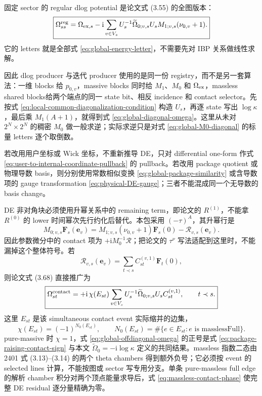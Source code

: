 \documentclass[11pt,a4paper]{ctexart}
\newcommand{\ii}{\mathrm i}
\newcommand{\cR}{\mathcal R}
\begin{document}
固定 sector 的 regular dlog potential 是论文式 (3.55) 的全图版本：
\begin{equation}
 \boxed{
 \Omega_{ss}^{\rm reg}
 =\Omega_{{\rm ex},s}
 -\ii\sum_{v\in V_s}
 U_s^{-1}\widetilde\Omega_{0;v,s}U_s
 M_{1;v,s}(\nu_{0,v}+1).
 }
 \label{eq:global-diagonal-omega}
\end{equation}
它的 letters 就是全部式 \eqref{eq:global-energy-letter}，不需要先对 IBP 关系做线性求解。

因此 dlog producer 与迭代 producer 使用的是同一份 registry，而不是另一套算法：一维 blocks 给 $p_{0,v}$，massive blocks 同时给 $M_1$、$M_0$ 和 $\Omega_{\rm ex}$，massless shared blocks给两个端点的同一 state bit、相反 incidence 和 contact selector。先按式 \eqref{eq:local-common-diagonalization-condition} 构造 $U_s$，再逐 state 写出 $\log\kappa$，最后乘 $M_1(A+1)$，就得到式 \eqref{eq:global-diagonal-omega}。这里从未对 $2^N\times2^N$ 的稠密 $M_0$ 做一般求逆；实际求逆只是对式 \eqref{eq:global-M0-diagonal} 的标量 letters 逐个取倒数。

若改用用户坐标或 Wick 坐标，不重新推导 DE，只对 differential one-form 作式 \eqref{eq:user-to-internal-coordinate-pullback} 的 pullback。若改用 package quotient 或物理导数 basis，则分别使用常数相似变换 \eqref{eq:global-package-similarity} 或含导数项的 gauge transformation \eqref{eq:physical-DE-gauge}；三者不能混成同一个无导数的 basis change。

DE 非对角块必须使用升幂关系中的 remaining term，即论文的 $R^{(1)}$，不能拿 $R^{(0)}$ 的 lower 时间幂次先行约化后替代。本包采用 $(-\tau)^A$，其升幂行是
\begin{equation}
 M_{0;v,s}\bm F_s(\bm e_v)
 =M_{1;v,s}(\nu_{0,v}+1)\bm F_s(0)-\cR_{v,s}(\bm e_v).
 \label{eq:package-raising-contact-sign}
\end{equation}
因此参数微分中的 contact 项为 $+\ii M_0^{-1}\cR$；把论文的 $\tau^\nu$ 写法适配到这里时，不能漏掉这个整体符号。若
\begin{equation}
 \cR_{v,s}(\bm e_v)=\sum_{t\prec s}C_{st}^{(v,1)}\bm F_t(0),
\end{equation}
则论文式 (3.68) 直接推广为
\begin{equation}
 \boxed{
 \Omega_{st}^{\rm contact}
 =+\ii\,\chi(E_{st})\sum_{v\in V_s}
 U_s^{-1}\widetilde\Omega_{0;v,s}U_s
 C_{st}^{(v,1)},
 \qquad t\prec s.
 }
 \label{eq:global-offdiagonal-omega}
\end{equation}
这里 $E_{st}$ 是该 simultaneous contact event 实际缩并的边集，
\begin{equation}
 \chi(E_{st})=(-1)^{N_0(E_{st})},
 \qquad
 N_0(E_{st})=\#\{e\in E_{st}:e\text{ is masslessFull}\}.
 \label{eq:massless-contact-phase}
\end{equation}
pure-massive 时 $\chi=1$，式 \eqref{eq:global-offdiagonal-omega} 的正号是式 \eqref{eq:package-raising-contact-sign} 与本文 $\widetilde\Omega_0=-\ii\log\kappa$ 定义的共同结果。massless 指数二态由 2401 式 (3.13)--(3.14) 的两个 theta chambers 得到额外负号；它必须按 event 的 selected lines 计算，不能按图或 sector 写专用分支。单条 pure-massless full edge 的解析 chamber 积分对两个顶点能量求导后，式 \eqref{eq:massless-contact-phase} 使完整 DE residual 逐分量精确为零。
\end{document}

